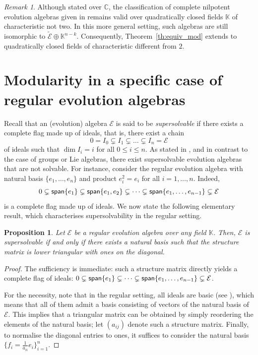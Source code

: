\documentclass[12pt,reqno]{amsart}
\theoremstyle{plain}%
\newtheorem{proposition}[theorem]{Proposition}%
\theoremstyle{definition}
\theoremstyle{remark}
\newtheorem{remark}[theorem]{Remark}
\newcommand{\E}{\mathcal{E}}
\DeclareMathOperator{\spa}{\textup{\textsf{span}}}
\numberwithin{equation}{section}
\begin{document}
\begin{remark}
Although stated over $\mathbb{C}$, the classification of complete nilpotent evolution algebras given in \cite[Theorem~4.2]{CKO_19} remains valid over quadratically closed fields $\mathbb{K}$ of characteristic not two. In this more general setting, such algebras are still isomorphic to $\widetilde{\E}\oplus\mathbb{K}^{n-k}$. Consequently, Theorem~\ref{th:equiv_mod} extends to quadratically closed fields of characteristic different from $2$.
\end{remark}
\section{Modularity in a specific case of regular evolution algebras}\label{sec:4}
Recall that an (evolution) algebra $\E$ is said to be \textit{supersolvable} if there exists a complete flag made up of ideals, that is, there exist a chain 
\[0=I_0\subsetneq I_1\subsetneq\dots\subsetneq I_n=\E\] of ideals such that $\dim{I_i}=i$ for all $0\leq i\leq n$. As stated in \cite[Remark~4.2]{LPP_25}, and in contrast to the case of groups or Lie algebras, there exist supersolvable evolution algebras that are not solvable. For instance, consider the regular evolution algebra with natural basis $\{e_1,\dots,e_n\}$ and product $e_i^2=e_i$ for all $i=1,\dots,n$. Indeed, 
\[0\subsetneq\spa\{e_1\}\subsetneq\spa\{e_1,e_2\}\subsetneq\dots\subsetneq\spa\{e_1,\dots,e_{n-1}\}\subsetneq\E\] is a complete flag made up of ideals.  We now state the following elementary result, which characterises supersolvability in the regular setting.
\begin{proposition}\label{prop:super_triangular}
Let $\mathcal{E}$ be a regular evolution algebra over any field $\mathbb{K}$. Then, $\mathcal{E}$ is supersolvable if and only if there exists a natural basis such that the structure matrix is lower triangular with ones on the diagonal.
\end{proposition}
\begin{proof}
The sufficiency is immediate: such a structure matrix directly yields a complete flag of ideals: $0\subsetneq\spa\{e_1\}\subsetneq\dots\subsetneq\spa\{e_1,\dots,e_{n-1}\}\subsetneq\E$.

For the necessity, note that in the regular setting, all ideals are basic (see \cite[Proposition~4.2]{BCS_22}), which means that all of them admit a basis consisting of vectors of the natural basis of $\E$. This implies that a triangular matrix can be obtained by simply reordering the elements of the natural basis; let $(a_{ij})$ denote such a structure matrix. Finally, to normalise the diagonal entries to ones, it suffices to consider the natural basis $\{f_i=\frac{1}{a_{ii}}e_i\}_{i=1}^n$.
\end{proof}
\end{document}
